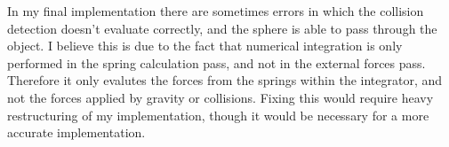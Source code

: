 \documentclass[]{acmsiggraph}
\begin{document}
In my final implementation there are sometimes errors in which the collision detection doesn't evaluate correctly, and the sphere is able to pass through the object. I believe this is due to the fact that numerical integration is only performed in the spring calculation pass, and not in the external forces pass. Therefore it only evalutes the forces from the springs within the integrator, and not the forces applied by gravity or collisions. Fixing this would require heavy restructuring of my implementation, though it would be necessary for a more accurate implementation.




\end{document}
